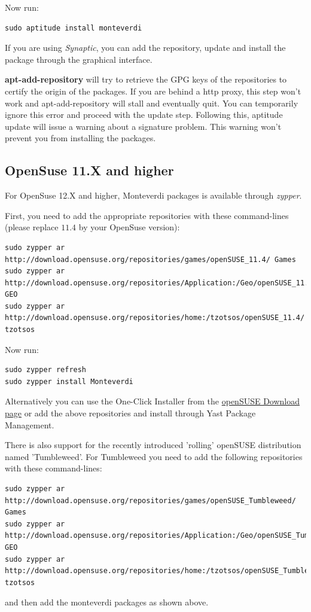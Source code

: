 Now run:
\begin{verbatim}
sudo aptitude install monteverdi
\end{verbatim}

If you are using \emph{Synaptic}, you can add the repository, update and install the package through the
graphical interface.

\textbf{apt-add-repository} will try to retrieve the GPG keys of the
repositories to certify the origin of the packages. If you are behind a http
proxy, this step won't work and apt-add-repository will stall and eventually
quit. You can temporarily ignore this error and proceed with the update
step. Following this, aptitude update will issue a warning about a signature
problem. This warning won't prevent you from installing the packages.

\subsection{OpenSuse 11.X and higher}
\label{ssec:opensuse_binaries}

For OpenSuse 12.X and higher, Monteverdi packages is available through
\emph{zypper}.

First, you need to add the appropriate repositories with these command-lines (please replace $11.4$ by your OpenSuse version):
\begin{verbatim}
sudo zypper ar
http://download.opensuse.org/repositories/games/openSUSE_11.4/ Games
sudo zypper ar
http://download.opensuse.org/repositories/Application:/Geo/openSUSE_11.4/ GEO
sudo zypper ar
http://download.opensuse.org/repositories/home:/tzotsos/openSUSE_11.4/ tzotsos
\end{verbatim}

Now run:
\begin{verbatim}
sudo zypper refresh
sudo zypper install Monteverdi
\end{verbatim}

Alternatively you can use the One-Click Installer from the \href{http://software.opensuse.org/search?q=Orfeo&baseproject=openSUSE\%3A11.4&lang=en&include_home=true&exclude_debug=true}{openSUSE Download page} or add the above repositories and install through Yast Package Management.

There is also support for the recently introduced 'rolling' openSUSE distribution named 'Tumbleweed'.
For Tumbleweed you need to add the following repositories with these command-lines:
\begin{verbatim}
sudo zypper ar
http://download.opensuse.org/repositories/games/openSUSE_Tumbleweed/ Games
sudo zypper ar
http://download.opensuse.org/repositories/Application:/Geo/openSUSE_Tumbleweed/ GEO
sudo zypper ar
http://download.opensuse.org/repositories/home:/tzotsos/openSUSE_Tumbleweed/ tzotsos
\end{verbatim}
and then add the monteverdi packages as shown above.

